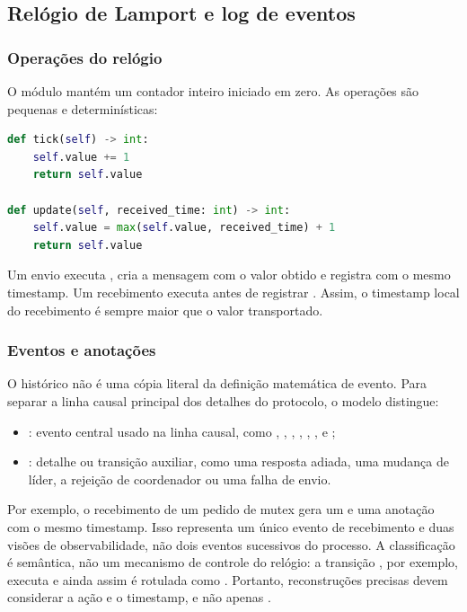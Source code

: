 \subsection{Relógio de Lamport e log de eventos}

\subsubsection{Operações do relógio}

O módulo  mantém um contador inteiro iniciado em zero. As operações são pequenas e determinísticas:

\begin{lstlisting}[language=Python,caption={Operações essenciais do relógio lógico.}]
def tick(self) -> int:
    self.value += 1
    return self.value

def update(self, received_time: int) -> int:
    self.value = max(self.value, received_time) + 1
    return self.value
\end{lstlisting}

Um envio executa , cria a mensagem com o valor obtido e registra  com o mesmo timestamp. Um recebimento executa  antes de registrar . Assim, o timestamp local do recebimento é sempre maior que o valor transportado.

\subsubsection{Eventos e anotações}

O histórico não é uma cópia literal da definição matemática de evento. Para separar a linha causal principal dos detalhes do protocolo, o modelo distingue:

\begin{itemize}
    \item {}: evento central usado na linha causal, como , , , , , ,  e ;
    \item {}: detalhe ou transição auxiliar, como uma resposta adiada, uma mudança de líder, a rejeição de coordenador ou uma falha de envio.
\end{itemize}

Por exemplo, o recebimento de um pedido de mutex gera um  e uma anotação  com o mesmo timestamp. Isso representa um único evento de recebimento e duas visões de observabilidade, não dois eventos sucessivos do processo. A classificação é semântica, não um mecanismo de controle do relógio: a transição , por exemplo, executa  e ainda assim é rotulada como . Portanto, reconstruções precisas devem considerar a ação e o timestamp, e não apenas .

